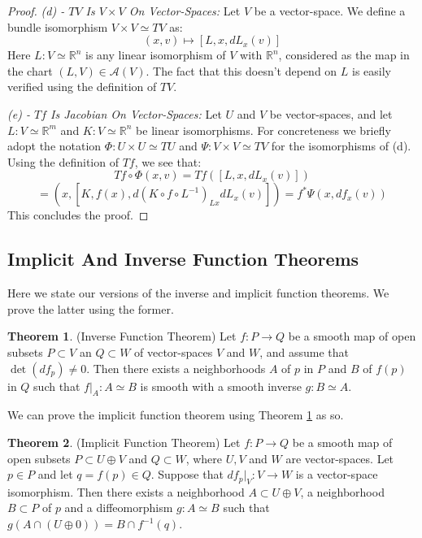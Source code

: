 \documentclass[12pt]{article}
\theoremstyle{definition}
\newtheorem{theorem}{Theorem}[section]
\numberwithin{equation}{section}
\newcommand{\R}{{\mathbb R}}
\begin{document}
\begin{proof}
\vspace{5pt}

\emph{(d) - $TV$ Is $V \times V$ On Vector-Spaces:} Let $V$ be a vector-space. We define a bundle isomorphism $V \times V \simeq TV$ as:
\[
(x,v) \mapsto [L,x,dL_x(v)]
\]
Here $L:V \simeq \R^n$ is any linear isomorphism of $V$ with $\R^n$, considered as the map in the chart $(L,V) \in \mathcal{A}(V)$. The fact that this doesn't depend on $L$ is easily verified using the definition of $TV$.

\emph{(e) - $Tf$ Is Jacobian On Vector-Spaces:} Let $U$ and $V$ be vector-spaces, and let $L:V \simeq \R^m$ and $K:V \simeq \R^n$ be linear isomorphisms. For concreteness we briefly adopt the notation $\Phi:U \times U \simeq TU$ and $\Psi:V \times V \simeq TV$ for the isomorphisms of (d). Using the definition of $Tf$, we see that:
\[Tf \circ \Phi (x,v) = Tf([L,x,dL_x(v)]) \]
\[= (x,[K,f(x),d(K \circ f \circ L^{-1})_{Lx}dL_x(v)]) = f^*\Psi(x,df_x(v))\]
This concludes the proof. \end{proof}

\subsection{Implicit And Inverse Function Theorems} \label{subsec:inverse_and_implicit} Here we state our versions of the inverse and implicit function theorems. We prove the latter using the former.

\begin{theorem} \label{thm:inverse_function_theorem} (Inverse Function Theorem) Let $f:P \to Q$ be a smooth map of open subsets $P \subset V$ an $Q \subset W$ of vector-spaces $V$ and $W$, and assume that $\det(df_p) \neq 0$. Then there exists a neighborhoods $A$ of $p$ in $P$ and $B$ of $f(p)$ in $Q$ such that $f|_A:A \simeq B$ is smooth with a smooth inverse $g:B \simeq A$. 
\end{theorem} 

We can prove the implicit function theorem using Theorem \ref{thm:inverse_function_theorem} as so.

\begin{theorem} \label{thm:implicit_function_theorem} (Implicit Function Theorem) Let $f:P \to Q$ be a smooth map of open subsets $P \subset U \oplus V$ and $Q \subset W$, where $U,V$ and $W$ are vector-spaces. Let $p \in P$ and let $q = f(p) \in Q$. Suppose that $df_p|_V:V \to W$ is a vector-space isomorphism. Then there exists a neighborhood $A \subset U \oplus V$, a neighborhood $B \subset P$ of $p$ and a diffeomorphism $g:A \simeq B$ such that $g(A \cap (U \oplus 0)) = B \cap f^{-1}(q)$.
\end{theorem}  
\end{document}
